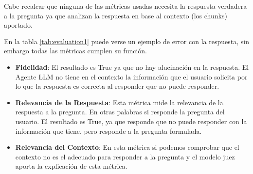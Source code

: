 Cabe recalcar que ninguna de las métricas usadas necesita la respuesta verdadera a la pregunta ya que analizan la respuesta en base al contexto (los chunks) aportado.

En la tabla \ref{tab:evaluation1} puede verse un ejemplo de error con la respuesta, sin embargo todas las métricas cumplen su función.

\begin{itemize}
    \item \textbf{Fidelidad}: El resultado es True ya que no hay alucinación en la respuesta. El Agente LLM no tiene en el contexto la información que el usuario solicita por lo que la respuesta es correcta al responder que no puede responder.
    \item \textbf{Relevancia de la Respuesta}: Esta métrica mide la relevancia de la respuesta a la pregunta. En otras palabras si responde la pregunta del usuario. El resultado es True, ya que responde que no puede responder con la información que tiene, pero responde a la pregunta formulada.
    \item \textbf{Relevancia del Contexto}: En esta métrica si podemos comprobar que el contexto no es el adecuado para responder a la pregunta y el modelo juez aporta la explicación de esta métrica.
\end{itemize}

